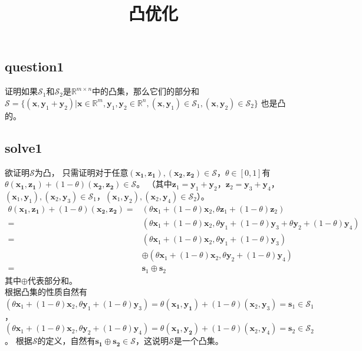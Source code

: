 \documentclass[12pt,a4paper]{ctexart}
\title{\heiti 凸优化}
\date{}
\begin{document}
\maketitle

\subsection*{question1}
证明如果$\mathcal{S}_1$和$\mathcal{S}_2$是$\mathbb{R}^{m \times n}$中的凸集，那么它们的部分和
$\mathcal{S}=\{(\boldsymbol{x},\boldsymbol{y}_1+\boldsymbol{y}_2)|\boldsymbol{x} \in \mathbb{R}^m,\boldsymbol{y}_1,\boldsymbol{y}_2 \in \mathbb{R}^n,(\boldsymbol{x},\boldsymbol{y}_1) \in \mathcal{S}_1,(\boldsymbol{x},\boldsymbol{y}_2)\in \mathcal{S}_2\}$
也是凸的。

\subsection*{solve1}
欲证明$\mathcal{S}$为凸，
只需证明对于任意$(\boldsymbol{x_1},\boldsymbol{z_1}),(\boldsymbol{x_2},\boldsymbol{z_2}) \in \mathcal{S}$，$\theta \in [0,1]$有$\theta(\boldsymbol{x_1},\boldsymbol{z_1})+(1-\theta)(\boldsymbol{x_2},\boldsymbol{z_2}) \in \mathcal{S}$。
（其中$\boldsymbol{z}_1=\boldsymbol{y}_1+\boldsymbol{y}_2$，$\boldsymbol{z}_2=\boldsymbol{y}_3+\boldsymbol{y}_4$，$
(\boldsymbol{x}_1,\boldsymbol{y}_1),(\boldsymbol{x}_2,\boldsymbol{y}_3) \in \mathcal{S}_1$，$(\boldsymbol{x}_1,\boldsymbol{y}_2),(\boldsymbol{x}_2,\boldsymbol{y}_4) \in \mathcal{S}_2$）。
\begin{align*}
\theta(\boldsymbol{x_1},\boldsymbol{z_1})+(1-\theta)(\boldsymbol{x_2},\boldsymbol{z_2})
=&(\theta \boldsymbol{x}_1+(1-\theta)\boldsymbol{x}_2,\theta \boldsymbol{z}_1+(1-\theta)\boldsymbol{z}_2)\\
=&(\theta \boldsymbol{x}_1+(1-\theta)\boldsymbol{x}_2,\theta\boldsymbol{y}_1+(1-\theta)\boldsymbol{y}_3+\theta \boldsymbol{y}_2+(1-\theta)\boldsymbol{y}_4)\\
=&(\theta \boldsymbol{x}_1+(1-\theta)\boldsymbol{x}_2,\theta\boldsymbol{y}_1+(1-\theta)\boldsymbol{y}_3)\\
&\oplus(\theta \boldsymbol{x}_1+(1-\theta)\boldsymbol{x}_2,\theta \boldsymbol{y}_2+(1-\theta)\boldsymbol{y}_4)\\
=&\boldsymbol{s}_1\oplus\boldsymbol{s}_2
\end{align*}
其中$\oplus$代表部分和。\\
根据凸集的性质自然有
$(\theta \boldsymbol{x}_1+(1-\theta)\boldsymbol{x}_2,\theta\boldsymbol{y}_1+(1-\theta)\boldsymbol{y}_3)=\theta(\boldsymbol{x_1},\boldsymbol{y_1})+(1-\theta)(\boldsymbol{x}_2,\boldsymbol{y}_3)=\boldsymbol{s}_1 \in \mathcal{S}_1$，
$(\theta \boldsymbol{x}_1+(1-\theta)\boldsymbol{x}_2,\theta\boldsymbol{y}_2+(1-\theta)\boldsymbol{y}_4)=\theta(\boldsymbol{x_1},\boldsymbol{y_2})+(1-\theta)(\boldsymbol{x}_2,\boldsymbol{y}_4)=\boldsymbol{s}_2 \in \mathcal{S}_2$。
根据$\mathcal{S}$的定义，自然有$\boldsymbol{s_1}\oplus\boldsymbol{s_2} \in \mathcal{S}$，这说明$\mathcal{S}$是一个凸集。
\end{document}
